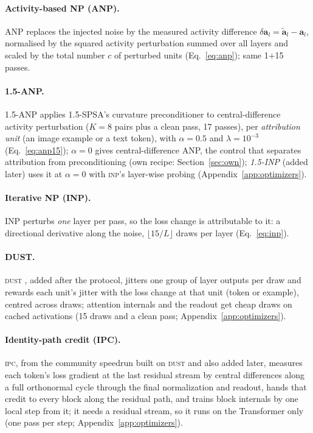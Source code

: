 \documentclass{article}
\newcommand{\method}[1]{\textsc{#1}}
\newcommand{\INP}{\method{inp}}
\newcommand{\DUST}{\method{dust}}
\newcommand{\IPC}{\method{ipc}}
\newcommand{\ba}{\mathbf{a}}
\begin{document}
\paragraph{Activity-based NP (ANP).}
ANP \citep{dalm2023} replaces the injected noise by the measured activity difference
$\delta\ba_l=\tilde{\ba}_l-\ba_l$, normalised by the squared activity perturbation
summed over all layers and scaled by the total number $c$ of perturbed units
(Eq.~\eqref{eq:anp}); same 1$+$15 passes.

\paragraph{1.5-ANP.}
1.5-ANP \citep{chaubard2025anp15} applies 1.5-SPSA's curvature preconditioner to
central-difference activity perturbation ($K=8$ pairs plus a clean pass, 17 passes),
per \emph{attribution unit} (an image example or a text token), with
$\alpha=0.5$ and $\lambda=10^{-3}$ (Eq.~\eqref{eq:anp15}); $\alpha=0$ gives
central-difference ANP, the control that separates attribution from preconditioning
(own recipe: Section~\ref{sec:own}); \emph{1.5-INP} (added later) uses it at $\alpha=0$
with \INP{}'s layer-wise probing (Appendix~\ref{app:optimizers}).

\paragraph{Iterative NP (INP).}
INP \citep{dalm2023} perturbs \emph{one} layer per pass, so the loss change is
attributable to it: a directional derivative along the noise, $\lfloor 15/L\rfloor$
draws per layer (Eq.~\eqref{eq:inp}).

\paragraph{DUST.}
\DUST{} \citep{dahal2026dust}, added after the protocol, jitters one group of layer
outputs per draw and rewards each unit's jitter with the loss change at that unit (token
or example), centred across draws; attention internals and the readout get cheap draws
on cached activations (15 draws and a clean pass; Appendix~\ref{app:optimizers}).

\paragraph{Identity-path credit (IPC).}
\IPC{}, from the community speedrun built on \DUST{} \citep{noise2026} and also added
later, measures each token's loss gradient at the last residual stream by central
differences along a full orthonormal cycle through the final normalization and readout,
hands that credit to every block along the residual path, and trains block internals by
one local step from it; it needs a residual stream, so it runs on the Transformer only
(one pass per step; Appendix~\ref{app:optimizers}).
\end{document}
